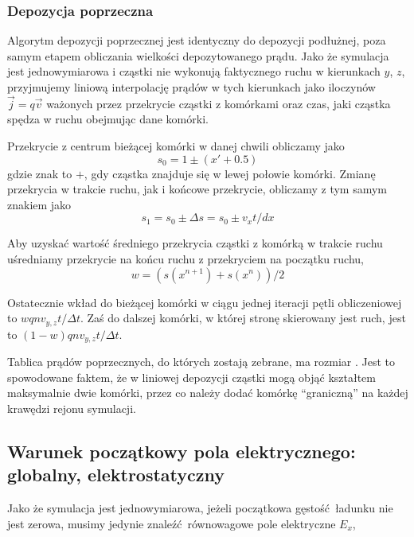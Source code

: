 \subsubsection{Depozycja poprzeczna}
Algorytm depozycji poprzecznej jest identyczny do depozycji podłużnej, poza samym etapem obliczania
wielkości depozytowanego prądu. Jako że symulacja jest jednowymiarowa i cząstki nie wykonują
faktycznego ruchu w kierunkach $y$, $z$, przyjmujemy liniową interpolację
prądów w tych kierunkach jako iloczynów $\vec{j}=q\vec{v}$ ważonych przez przekrycie
cząstki z komórkami oraz czas, jaki cząstka spędza w ruchu obejmując dane
komórki.

Przekrycie z centrum bieżącej komórki w danej chwili obliczamy jako
\begin{equation}
    s_0 = 1 \pm (x' + 0.5) 
\end{equation}
gdzie znak to $+$, gdy cząstka znajduje się w lewej połowie komórki. Zmianę
przekrycia w trakcie ruchu, jak i końcowe przekrycie, obliczamy z tym samym znakiem jako 
\begin{equation}
    s_1 = s_0 \pm \Delta s = s_0 \pm v_x t / dx
\end{equation}


Aby uzyskać wartość średniego przekrycia cząstki z komórką w trakcie ruchu
uśredniamy przekrycie na końcu ruchu z przekryciem na początku ruchu,
\begin{equation}
    w = \left(s(x^{n+1}) + s(x^n)\right)/{2}
\end{equation}

Ostatecznie wkład do bieżącej komórki w ciągu jednej iteracji pętli obliczeniowej
to $w q n v_{y, z} t / \Delta t$.
Zaś do dalszej komórki, w której stronę skierowany jest ruch, jest to  $(1-w) q n v_{y, z} t / \Delta t$.

Tablica prądów poprzecznych, do których zostają zebrane, ma rozmiar
. Jest to spowodowane faktem, że w liniowej depozycji
cząstki mogą objąć kształtem maksymalnie dwie komórki, przez co należy dodać
komórkę ``graniczną'' na każdej krawędzi rejonu symulacji.

\subsection{Warunek początkowy pola elektrycznego:  globalny, elektrostatyczny}
Jako że symulacja jest jednowymiarowa, jeżeli początkowa gęstość ładunku nie jest zerowa, musimy jedynie znaleźć równowagowe pole
elektryczne $E_x$,

